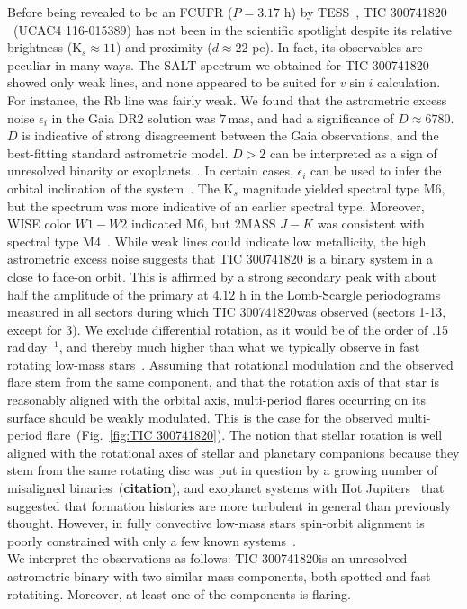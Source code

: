 \documentclass[fleqn,usenatbib,letters]{mnras}%
\newcommand{\FF}{TIC 300741820} %
\begin{document}
Before being revealed to be an FCUFR ($P=3.17$ h) by TESS~\citep{zhan2019}, \FF\,~(UCAC4 116-015389) has not been in the scientific spotlight despite its relative brightness (K$_s\approx11$) and proximity ($d\approx22$ pc). In fact, its observables are peculiar in many ways. The SALT spectrum we obtained for \FF\; showed only weak lines, and none appeared to be suited for $v \sin i$ calculation. For instance, the Rb line was fairly weak. We found that the astrometric excess noise $\epsilon_i$ in the Gaia DR2 solution was $7$\,mas, and had a significance of $D\approx6780$. $D$ is indicative of strong disagreement between the Gaia observations, and the best-fitting standard astrometric model. $D>2$ can be interpreted as a sign of unresolved binarity or exoplanets~\citep{lindegren2012}. In certain cases, $\epsilon_i$ can be used to infer the orbital inclination of the system~\citep{kiefer2019a, kiefer2019b}. The K$_s$ magnitude yielded spectral type M6, but the spectrum was more indicative of an earlier spectral type. Moreover, WISE color $W1-W2$ indicated M6, but 2MASS $J-K$ was consistent with spectral type M4~\citep{pecaut2013}. While weak lines could indicate low metallicity, the high astrometric excess noise suggests that \FF\; is a binary system in a close to face-on orbit. This is affirmed by a strong secondary peak with about half the amplitude of the primary at $4.12$ h in the Lomb-Scargle periodograms measured in all sectors during which \FF was observed (sectors 1-13, except for 3). We exclude differential rotation, as it would be of the order of .15 rad\,day$^{-1}$, and thereby much higher than what we typically observe in fast rotating low-mass stars~\citep{davenport2015, balona2016}. Assuming that rotational modulation and the observed flare stem from the same component, and that the rotation axis of that star is reasonably aligned with the orbital axis, multi-period flares occurring on its surface should be weakly modulated. This is the case for the observed multi-period flare~(Fig.~\ref{fig:\FF}). The notion that stellar rotation is well aligned with the rotational axes of stellar and planetary companions because they stem from the same rotating disc was put in question by a growing number of misaligned binaries~(\textbf{citation}), and exoplanet systems with Hot Jupiters~\citep{winn2010} that suggested that formation histories are more turbulent in general than previously thought. However, in fully convective low-mass stars spin-orbit alignment is poorly constrained with only a few known systems~\citep{konopacky2012, harding2013, zhang2020}.
\\
We interpret the observations as follows: \FF is an unresolved astrometric binary with two similar mass components, both spotted and fast rotatiting. Moreover, at least one of the components is flaring.
\end{document}
